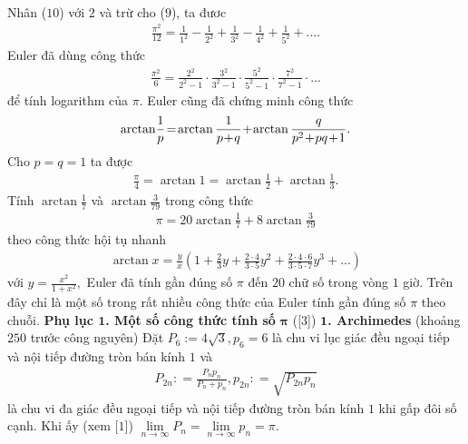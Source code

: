 \begin{multicols}{2}
\begin{align*}
	\end{align*}
	Nhân ($10$) với $2$ và trừ cho ($9$), ta đươc
	\begin{align*}
		\frac{{{\pi ^2}}}{{12}} = \frac{1}{{{1^2}}} - \frac{1}{{{2^2}}} + \frac{1}{{{3^2}}} - \frac{1}{{{4^2}}} + \frac{1}{{{5^2}}} + ....
	\end{align*}
	Euler đã dùng công thức
	\begin{align*}
		\frac{\pi^2}{6} = \frac{2^2}{2^2 - 1} \cdot \frac{3^2}{3^2 - 1} \cdot \frac{5^2}{5^2 - 1} \cdot \frac{7^2}{7^2 - 1} \cdot ...
	\end{align*}
	để tính logarithm của $\pi$.
	\vskip 0.1cm  
	Euler cũng đã chứng minh công thức
	\begin{align*}
		{\rm{arctan}}\frac{1}{p}\! =\! \arctan \frac{1}{{p \!+\! q}} \!+\! \arctan \frac{q}{{{p^2} \!+\! pq \!+\! 1}}.
	\end{align*}
	Cho $p = q = 1$ ta được 
	\begin{align*}
		\frac{\pi }{4} = \arctan 1 = \arctan \frac{1}{2} + \arctan \frac{1}{3}.
	\end{align*}
	Tính $\arctan \frac{1}{7}$  và  $\arctan \frac{3}{{79}}$ trong công thức
	\begin{align*}
		\pi  = 20\arctan \frac{1}{7} + 8\arctan \frac{3}{{79}}
	\end{align*}
	theo công thức hội tụ nhanh
	\begin{align*}
		\arctan x \!=\! \frac{y}{x}\left( {1 \!+\! \frac{2}{3}y \!+\! \frac{{2 \!\cdot\! 4}}{{3 \!\cdot\! 5}}{y^2} \!+\! \frac{{2 \!\cdot \!4 \!\cdot\! 6}}{{3 \!\cdot\! 5 \!\cdot\! 7}}{y^3} \!+\! ...} \right)
	\end{align*}
	với $y = \frac{{{x^2}}}{{1 + {x^2}}},$  Euler đã tính gần đúng số $\pi$  đến $20$ chữ số trong vòng $1$ giờ.
	\vskip 0.1cm
	Trên đây chỉ là một số trong rất nhiều công thức của Euler tính gần đúng số $\pi$  theo chuỗi.
	\vskip 0.1cm
	\textbf{\color{lichsutoanhoc}Phụ lục $\pmb1$. Một số công thức tính số} $\pmb{\pi}$ ([$3$])
	\vskip 0.1cm
	$\pmb1$\textbf{\color{lichsutoanhoc}. Archimedes} (khoảng $250$ trước công nguyên)
	\vskip 0.1cm
	Đặt  $P_6 := 4\sqrt{3}, p_6 = 6$ là chu vi lục giác đều ngoại tiếp và nội tiếp đường tròn bán kính $1$ và
	\begin{align*}
		{P_{2n}}: = \frac{{{P_n}{p_n}}}{{{P_n} + {p_n}}}, {p_{2n}}: = \sqrt {{P_{2n}}{p_n}} 
	\end{align*}
	là chu vi đa giác đều ngoại tiếp và nội tiếp đường tròn bán kính $1$ khi gấp đôi số cạnh. Khi ấy (xem [$1$])  $\mathop {\lim }\limits_{n \to \infty } {P_n} = \mathop {\lim }\limits_{n \to \infty } {p_n} = \pi$.

\end{multicols}
